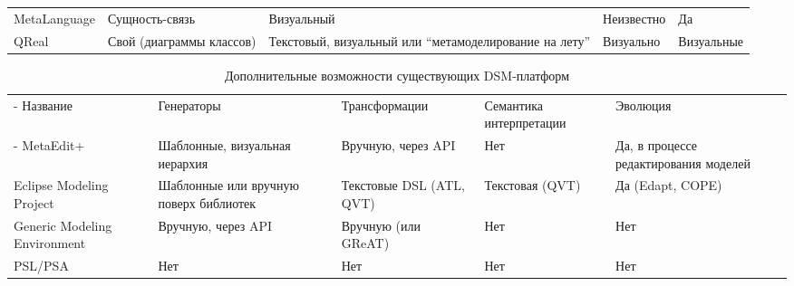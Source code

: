 \begin{table}[ht]
\begin{small}
\begin{longtabu} {| X[1 l p] | X[1 l p] | X[1 l p] | X[1 l p] |X[1 l p] |}
		MetaLanguage                 & Сущность-связь                  & Визуальный                                              & Неизвестно                                               & Да                                             \\
		 QReal  & Свой (диаграммы классов)        & Текстовый, визуальный или "`метамоделирование на лету"' & Визуально                                                & Визуальные                                     
		\label{tab:existingPlatformsMain}
	\end{longtabu}
\end{small}
\end{table}

\begin{table}[ht]
\begin{small}
	\begin{longtabu} {| X[1 l p] | X[1 l p] | X[1 l p] | X[1 l p] | X[1 l p] |}
		\caption{Дополнительные возможности существующих DSM-платформ} \\
		\tabucline-
		 Название                    & Генераторы                                    & Трансформации                                  & Семантика интерпретации                             & Эволюция                                                                   \\
		\tabucline-
		\everyrow{\tabucline-}
		MetaEdit+                    & Шаблонные, визуальная иерархия                & Вручную, через API                             & Нет                                                 & Да, в процессе редактирования моделей                                      \\
		Eclipse Modeling Project     & Шаблонные или вручную поверх библиотек        & Текстовые DSL (ATL, QVT)                       & Текстовая (QVT)                                     & Да (Edapt, COPE)                                                           \\
		Generic Modeling Environment & Вручную, через API                            & Вручную (или GReAT)                            & Нет                                                 & Нет                                                                        \\
		PSL/PSA                      & Нет                                           & Нет                                            & Нет                                                 & Нет                                                                        \\

\end{longtabu}
\end{small}
\end{table}
